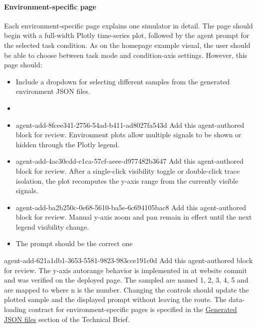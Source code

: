 \documentclass[11pt]{article}
\begin{document}
\paragraph{Environment-specific page}
Each environment-specific page explains one simulator in detail. 
The page should begin with a full-width Plotly time-series plot, followed by the agent prompt for the selected task condition. 
As on the homepage example visual, the user should be able to choose between task mode and condition-axis settings. 
However, this page should:
\begin{itemize}
  \item Include a dropdown for selecting different samples from the generated environment JSON files. 
  \item {}
  \item \agentProposedEdit
    {agent-add-8fcee341-2756-54ad-b411-ad8027fa543d}
    {Add this agent-authored block for review.}
    {}
    {Environment plots allow multiple signals to be shown or hidden through the Plotly legend.}
  \item \agentProposedEdit
    {agent-add-4ac30cdd-c1ca-57cf-aeee-d977482b3647}
    {Add this agent-authored block for review.}
    {}
    {After a single-click visibility toggle or double-click trace isolation, the plot recomputes the y-axis range from the currently visible signals.}
  \item \agentProposedEdit
    {agent-add-ba2b250c-0e68-5610-ba5e-6c694105bac8}
    {Add this agent-authored block for review.}
    {}
    {Manual y-axis zoom and pan remain in effect until the next legend visibility change.}
  \item The prompt should be the correct one 
\end{itemize}
\agentProposedEdit
  {agent-add-621a1db1-3653-5581-9823-983cce191c0d}
  {Add this agent-authored block for review.}
  {}
  {The y-axis autorange behavior is implemented in  at website commit  and was verified on the deployed  page.}
The sampled are named 1, 2, 3, 4, 5 and are mapped to  where n is the number.
Changing the controls should update the plotted sample and the displayed prompt without leaving the route.
The data-loading contract for environment-specific pages is specified in the \hyperref[sec:website-generated-json]{Generated JSON files} section of the Technical Brief.
\end{document}
